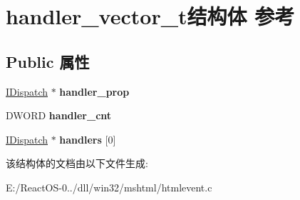 \hypertarget{structhandler__vector__t}{}\section{handler\+\_\+vector\+\_\+t结构体 参考}
\label{structhandler__vector__t}
\subsection*{Public 属性}
\begin{DoxyCompactItemize}
\item 
\mbox{\label{structhandler__vector__t_a34737dabfcae720edd9aa7889b43e391}} 
\hyperlink{interface_i_dispatch}{I\+Dispatch} $\ast$ {\bfseries handler\+\_\+prop}
\item 
\mbox{\label{structhandler__vector__t_a943b03c38ba160614f9cb2b95d051ecc}} 
D\+W\+O\+RD {\bfseries handler\+\_\+cnt}
\item 
\mbox{\label{structhandler__vector__t_a310405df419e0959e44e742840568356}} 
\hyperlink{interface_i_dispatch}{I\+Dispatch} $\ast$ {\bfseries handlers} \mbox{[}0\mbox{]}
\end{DoxyCompactItemize}


该结构体的文档由以下文件生成\+:\begin{DoxyCompactItemize}
\item 
E\+:/\+React\+O\+S-\/0../dll/win32/mshtml/htmlevent.\+c\end{DoxyCompactItemize}

